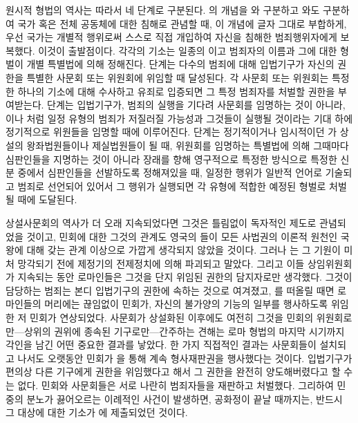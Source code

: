 원시적 형법의 역사는 따라서 네 단계로 구분된다.
의 개념을
와 구분하고
와도 구분하여
국가 혹은 전체 공동체에 대한 침해로 관념할 때,
이 개념에 글자 그대로 부합하게,
우선
국가는
개별적 행위로써 스스로 직접 개입하여
자신을 침해한 범죄행위자에게 보복했다.
이것이 출발점이다.
각각의 기소는 일종의 이고
범죄자의 이름과 그에 대한 형벌이 개별 특별법에 의해 정해진다.
 단계는
다수의 범죄에 대해
입법기구가 자신의 권한을 특별한 사문회 또는 위원회에 위임할 때
달성된다.
각 사문회 또는 위원회는
특정한 하나의 기소에 대해 수사하고
유죄로 입증되면 그 특정 범죄자를 처벌할 권한을 부여받는다.
 단계는
입법기구가,
범죄의 실행을 기다려
사문회를 임명하는 것이 아니라,
이나 처럼
일정 유형의 범죄가 저질러질 가능성과
 그것들이 실행될 것이라는 기대 하에
정기적으로 위원들을 임명할 때에 이루어진다.
 단계는
정기적이거나 임시적이던 가
상설의 왕좌법원들이나 제실법원들이 될 때,
위원회를 임명하는 특별법에 의해 그때마다
심판인들을
지명하는 것이 아니라
장래를 향해 영구적으로
특정한 방식으로 특정한 신분 중에서
심판인들을
선발하도록 정해져있을 때,
일정한 행위가 일반적 언어로 기술되고 범죄로 선언되어 있어서
그 행위가 실행되면 각 유형에 적합한 예정된 형벌로 처벌될 때에
도달된다.

상설사문회의 역사가 더 오래 지속되었다면
그것은 틀림없이 독자적인 제도로 관념되었을 것이고,
민회에 대한 그것의 관계도
영국의 들이
모든 사법권의 이론적 원천인
국왕에 대해 갖는 관계 이상으로
가깝게 생각되지 않았을 것이다.
그러나
는 그 기원이 미처 망각되기 전에
제정기의 전제정치에 의해
파괴되고 말았다.
그리고 이들 상임위원회가 지속되는 동안
로마인들은
그것을 단지 위임된 권한의 담지자로만 생각했다.
그것이 담당하는 범죄는 본디 입법기구의 권한에 속하는 것으로 여겨졌고,
를 떠올릴 때면
로마인들의 머리에는
끊임없이 민회가,
자신의 불가양의 기능의 일부를 행사하도록 위임한 저 민회가
연상되었다.
사문회가
상설화된 이후에도 여전히
그것을 민회의 위원회로만---상위의 권위에 종속된 기구로만---간주하는 견해는
로마 형법의 마지막 시기까지 각인을 남긴 어떤 중요한 결과를 낳았다.
한 가지 직접적인 결과는
사문회들이 설치되고 나서도 오랫동안
민회가
을 통해
계속
형사재판권을 행사했다는 것이다.
입법기구가 편의상 다른 기구에게 권한을 위임했다고 해서
그 권한을 완전히 양도해버렸다고 할 수는 없다.
민회와 사문회들은 서로 나란히 범죄자들을 재판하고 처벌했다.
그리하여
민중의 분노가 끓어오르는 이례적인 사건이 발생하면,
공화정이 끝날 때까지는,
반드시 그 대상에 대한 기소가
에 제출되었던 것이다.

